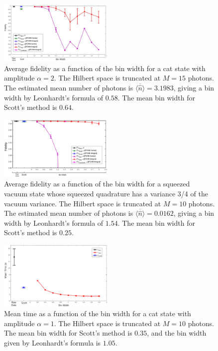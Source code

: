 \documentclass[
reprint,
superscriptaddress,
showpacs,
amsmath,
amssymb,
aps,
pra,
longbibliography
]{revtex4-1}
\begin{document}
\begin{figure}
  \includegraphics[width=0.49\textwidth]{catstate-alpha=2-15photons.eps}
  \caption{Average fidelity as a function of the bin width for a cat state
    with amplitude $\alpha = 2$. The Hilbert space is truncated at $M=15$
    photons. The estimated mean number of photons is $\overline{\langle \hat{n} \rangle}=3.1983$, giving a bin width by Leonhardt's formula of $0.58$.
    The mean bin width for Scott's method is $0.64$.}
  \label{fig-Fid_vs_binwidth_catstate_alpha_2_Mph_15}
\end{figure}

\begin{figure}
  \includegraphics[width=0.49\textwidth]{squeezedvacuum-10photons-Var=075.eps}
  \caption{Average fidelity as a function of the bin width for a squeezed
    vacuum state whose squeezed quadrature has a variance 3/4 of the
    vacuum variance. The Hilbert space is truncated at $M=10$ photons. 
    The estimated mean number of photons is $\overline{\langle \hat{n} \rangle}=0.0162$, giving a bin width by Leonhardt's formula of $1.54$.
    The mean bin width for Scott's method is $0.25$.}
  \label{fig-squeezed_vacuum_variance_075_Mph_10}
\end{figure}

\begin{figure}
  \includegraphics[width=0.49\textwidth]{time-estadogato_alpha_1.eps}
  \caption{Mean time as a function of the bin width for a cat state
    with amplitude $\alpha = 1$. The Hilbert space is truncated at $M=10$
    photons. The mean bin width for Scott's method is $0.35$, and the
    bin width given by Leonhardt's formula is $1.05$.}
  \label{fig-time-catstate}
\end{figure}
\end{document}
